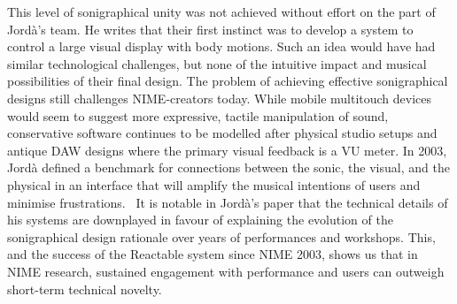 This level of sonigraphical unity was not achieved without effort on the part of Jord\`{a}'s team. He writes that their first instinct was to develop a system to control a large visual display with body motions. Such an idea would have had similar technological challenges, but none of the intuitive impact and musical possibilities of their final design. The problem of achieving effective sonigraphical designs still challenges NIME-creators today. While mobile multitouch devices would seem to suggest more expressive, tactile manipulation of sound, conservative software continues to be modelled after physical studio setups and antique DAW designs where the primary visual feedback is a VU meter. In 2003, Jord\`{a} defined a benchmark for connections between the sonic, the visual, and the physical in an interface that will amplify the musical intentions of users and minimise frustrations. 
It is notable in Jord\`{a}'s paper that the technical details of his systems are downplayed in favour of explaining the evolution of the sonigraphical design rationale over years of performances and workshops. This, and the success of the Reactable system since NIME 2003, shows us that in NIME research, sustained engagement with performance and users can outweigh short-term technical novelty.

